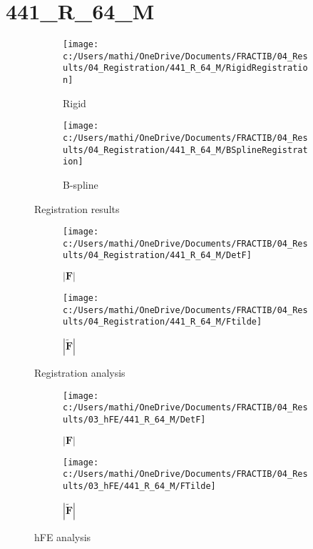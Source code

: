 \documentclass{article}%
\begin{document}
%
\newpage%
\section*{441\_R\_64\_M}%
\label{sec:441R64M}%


\begin{figure}[h!]%
\begin{subfigure}[b]{0.5\linewidth}%
\texttt{[image: c:/Users/mathi/OneDrive/Documents/FRACTIB/04\_Results/04\_Registration/441\_R\_64\_M/RigidRegistration]}%
\caption{Rigid}%
\end{subfigure}%
\begin{subfigure}[b]{0.5\linewidth}%
\texttt{[image: c:/Users/mathi/OneDrive/Documents/FRACTIB/04\_Results/04\_Registration/441\_R\_64\_M/BSplineRegistration]}%
\caption{B{-}spline}%
\end{subfigure}%
\caption{Registration results}%
\end{figure}

%


\begin{figure}[h!]%
\begin{subfigure}[b]{0.5\linewidth}%
\texttt{[image: c:/Users/mathi/OneDrive/Documents/FRACTIB/04\_Results/04\_Registration/441\_R\_64\_M/DetF]}%
\caption{$|\mathbf{F}|$}%
\end{subfigure}%
\begin{subfigure}[b]{0.5\linewidth}%
\texttt{[image: c:/Users/mathi/OneDrive/Documents/FRACTIB/04\_Results/04\_Registration/441\_R\_64\_M/Ftilde]}%
\caption{$|\widetilde{\mathbf{F}}|$}%
\end{subfigure}%
\caption{Registration analysis}%
\end{figure}

%


\begin{figure}[h!]%
\begin{subfigure}[b]{0.5\linewidth}%
\texttt{[image: c:/Users/mathi/OneDrive/Documents/FRACTIB/04\_Results/03\_hFE/441\_R\_64\_M/DetF]}%
\caption{$|\mathbf{F}|$}%
\end{subfigure}%
\begin{subfigure}[b]{0.5\linewidth}%
\texttt{[image: c:/Users/mathi/OneDrive/Documents/FRACTIB/04\_Results/03\_hFE/441\_R\_64\_M/FTilde]}%
\caption{$|\widetilde{\mathbf{F}}|$}%
\end{subfigure}%
\caption{hFE analysis}%
\end{figure}
\end{document}
